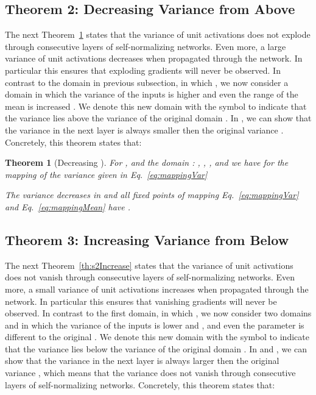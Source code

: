 \documentclass{article}
\newtheorem{theorem}{Theorem}
\begin{document}
\subsection{Theorem 2: Decreasing Variance from Above}
The next Theorem~\ref{th:s2Decrease} states 
that the variance of unit activations 
does not explode through
consecutive layers of self-normalizing networks.
Even more, a large variance of unit activations decreases when
propagated through the network. 
In particular this ensures that exploding gradients will never be
observed.
In contrast to the domain in previous subsection, 
in which , we now consider a domain
in which the variance of the inputs is higher  and even the 
range of the mean is increased . We denote this new domain with 
the symbol  to indicate that the variance lies above the variance of the original domain .
In , we can show that the variance  in the next layer is always smaller 
then the original variance .
Concretely, this theorem states that:

\begin{theorem}[Decreasing ]
\label{th:s2Decrease}
For ,  
and the domain : 
, 
,
, and 
 we have for 
the mapping of the variance
  given in Eq.~\eqref{eq:mappingVar}

The variance decreases in  and all fixed
points  of mapping Eq.~\eqref{eq:mappingVar} and Eq.~\eqref{eq:mappingMean} have .
\end{theorem}



\subsection{Theorem 3: Increasing Variance from Below}
The next Theorem~\ref{th:s2Increase} states 
that the variance of unit activations 
does not vanish through
consecutive layers of self-normalizing networks.
Even more, a small variance of unit activations increases when
propagated through the network. 
In particular this ensures that vanishing gradients will never be
observed.
In contrast to the first domain, 
in which , we now consider two domains  and
 in which the variance of the inputs is lower  and ,
and even the parameter  is different  to the original . 
We denote this new domain with 
the symbol  to indicate that the variance lies below the variance of the original domain .
In  and , 
we can show that the variance  in the next layer is always larger 
then the original variance , which means that the variance does not vanish through
consecutive layers of self-normalizing networks.
Concretely, this theorem states that: 
\end{document}

